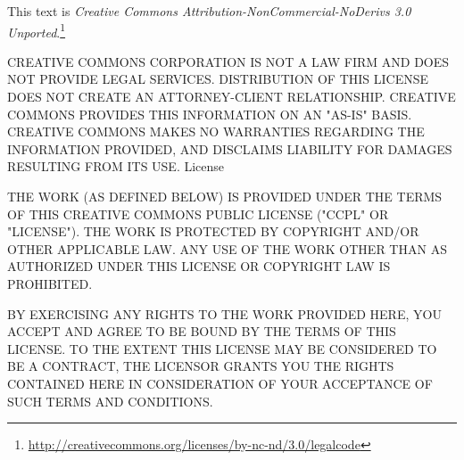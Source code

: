 
This text is \emph{Creative Commons Attribution-NonCommercial-NoDerivs 3.0
Unported}.\footnote{\url{http://creativecommons.org/licenses/by-nc-nd/3.0/legalcode}}

CREATIVE COMMONS CORPORATION IS NOT A LAW FIRM AND DOES NOT PROVIDE LEGAL
SERVICES. DISTRIBUTION OF THIS LICENSE DOES NOT CREATE AN ATTORNEY-CLIENT
RELATIONSHIP. CREATIVE COMMONS PROVIDES THIS INFORMATION ON AN "AS-IS" BASIS.
CREATIVE COMMONS MAKES NO WARRANTIES REGARDING THE INFORMATION PROVIDED, AND
DISCLAIMS LIABILITY FOR DAMAGES RESULTING FROM ITS USE.  License

THE WORK (AS DEFINED BELOW) IS PROVIDED UNDER THE TERMS OF THIS CREATIVE
COMMONS PUBLIC LICENSE ("CCPL" OR "LICENSE"). THE WORK IS PROTECTED BY
COPYRIGHT AND/OR OTHER APPLICABLE LAW. ANY USE OF THE WORK OTHER THAN AS
AUTHORIZED UNDER THIS LICENSE OR COPYRIGHT LAW IS PROHIBITED.

BY EXERCISING ANY RIGHTS TO THE WORK PROVIDED HERE, YOU ACCEPT AND AGREE TO BE
BOUND BY THE TERMS OF THIS LICENSE. TO THE EXTENT THIS LICENSE MAY BE
CONSIDERED TO BE A CONTRACT, THE LICENSOR GRANTS YOU THE RIGHTS CONTAINED HERE
IN CONSIDERATION OF YOUR ACCEPTANCE OF SUCH TERMS AND CONDITIONS.

